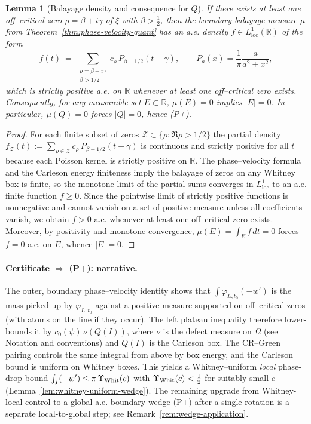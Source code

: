 \documentclass[11pt]{article}
\newtheorem{lemma}[theorem]{Lemma}
\theoremstyle{definition}
\theoremstyle{remark}
\theoremstyle{definition}
\newcommand{\R}{\mathbb{R}}
\begin{document}
\begin{lemma}[Balayage density and consequence for $Q$]\label{lem:balayage-density}
If there exists at least one off--critical zero $\rho=\beta+i\gamma$ of $\xi$ with $\beta>\tfrac12$, then the boundary balayage measure $\mu$ from Theorem~\ref{thm:phase-velocity-quant} has an a.e. density $f\in L^1_{\mathrm{loc}}(\mathbb R)$ of the form
\[
  f(t)\ =\ \sum_{\substack{\rho=\beta+i\gamma\\ \beta>1/2}} c_\rho\,P_{\beta-1/2}(t-\gamma),\qquad P_a(x)=\frac{1}{\pi}\frac{a}{a^2+x^2},
\]
which is strictly positive a.e. on $\R$ whenever at least one off--critical zero exists. Consequently, for any measurable set $E\subset\R$, $\mu(E)=0$ implies $|E|=0$. In particular, $\mu(Q)=0$ forces $|Q|=0$, hence \textup{(P+)}.
\end{lemma}
\begin{proof}
For each finite subset of zeros $\mathcal Z\subset\{\rho:\Re\rho>1/2\}$ the partial density
\(f_{\mathcal Z}(t):=\sum_{\rho\in\mathcal Z}c_\rho\,P_{\beta-1/2}(t-\gamma)\)
is continuous and strictly positive for all $t$ because each Poisson kernel is strictly positive on $\R$.
The phase--velocity formula and the Carleson energy finiteness imply the balayage of zeros on any Whitney box is finite, so the monotone limit of the partial sums converges in $L^1_{\mathrm{loc}}$ to an a.e. finite function $f\ge0$. Since the pointwise limit of strictly positive functions is nonnegative and cannot vanish on a set of positive measure unless all coefficients vanish, we obtain $f>0$ a.e. whenever at least one off--critical zero exists. Moreover, by positivity and monotone convergence, $\mu(E)=\int_E f\,dt=0$ forces $f=0$ a.e. on $E$, whence $|E|=0$.
\end{proof}

\paragraph{Certificate $\Rightarrow$ (P+): narrative.}
The outer, boundary phase–velocity identity shows that $\int\varphi_{L,t_0}(-w')$ is the mass picked up by $\varphi_{L,t_0}$ against a positive measure supported on off–critical zeros (with atoms on the line if they occur). The left plateau inequality therefore lower-bounds it by $c_0(\psi)\,\nu(Q(I))$, where $\nu$ is the defect measure on $\Omega$ (see Notation and conventions) and $Q(I)$ is the Carleson box. The CR–Green pairing controls the same integral from above by box energy, and the Carleson bound is uniform on Whitney boxes. This yields a Whitney–uniform \emph{local} phase-drop bound $\int_I(-w')\le \pi\,\Upsilon_{\rm Whit}(c)$ with $\Upsilon_{\rm Whit}(c)<\tfrac12$ for suitably small $c$ (Lemma~\ref{lem:whitney-uniform-wedge}). The remaining upgrade from Whitney-local control to a global a.e. boundary wedge \textup{(P+)} after a single rotation is a separate local-to-global step; see Remark~\ref{rem:wedge-application}.
\end{document}
